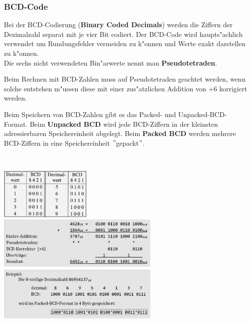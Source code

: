 \subsubsection{BCD-Code}
\begin{minipage}{9cm}
\vspace{-8ex}
	Bei der BCD-Codierung (\textbf{Binary Coded Decimals}) werden die Ziffern der Dezimalzahl separat mit je vier Bit codiert. Der BCD-Code wird haupts"achlich verwendet um Rundungsfehler vermeiden zu k"onnen und Werte exakt darstellen zu k"onnen.\\
	Die sechs nicht verwendeten Bin"arwerte nennt man \textbf{Pseudotetraden}.
	\vspace{2ex}

	Beim Rechnen mit BCD-Zahlen muss auf Pseudotetraden geachtet werden, wenn solche entstehen m"ussen diese mit einer zus"atzlichen Addition von +6 korrigiert werden.
	\vspace{2ex}
	
	Beim Speichern von BCD-Zahlen gibt es das Packed- und Unpacked-BCD-Format. Beim \textbf{Unpacked BCD} wird jede BCD-Ziffern in der kleinsten adressierbaren Speichereinheit abgelegt. Beim \textbf{Packed BCD} werden mehrere BCD-Ziffern in eine Speichereinheit $"$gepackt$"$.
\end{minipage}
%
\begin{minipage}{0.5cm}
	\ \
\end{minipage}
%
\begin{minipage}{9cm}
	\includegraphics[width=4.5cm]{pics/2-BCD-Code}\\
	\includegraphics[width=8cm]{pics/2-Pseudo_Tetrade}\\
	\includegraphics[width=8cm]{pics/2-Packed-BCD}
\end{minipage}


